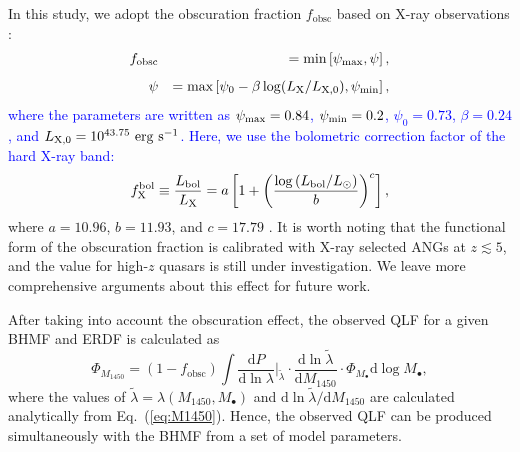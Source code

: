 \documentclass[twocolumn, twocolappendix]{aastex63}
\newcommand{\Mbh}{M_\bullet}
\newcommand{\fobsc}{f_\mathrm{obsc}}
\newcommand{\Muv}{M_{1450}}
\newcommand{\Lbol}{L_\mathrm{bol}}
\newcommand{\D}{\mathrm{d}}
\newcommand{\blue}[1]{\textcolor{blue}{ #1}}
\begin{document}
\begin{CJK*}{UTF8}{gbsn}
In this study, we adopt the obscuration fraction $\fobsc$ based on X-ray observations \citep{2014ApJ...786..104U}:
\blue{
%
\begin{eqnarray}
\fobsc && = \text{min}  \left[ \psi_{\rm max}, \psi \right], \\[5pt]
\psi &&= \text{max}\left[\psi_0  - \beta \log (L_{\rm X}/L_{\rm X,0}), \psi_{\rm min}     \right],
\end{eqnarray}
%
where the parameters are written as $\psi_{\rm max}=0.84$, $\psi_{\rm min}=0.2$, $\psi_{0}=0.73$, $\beta=0.24$, and $L_{\rm X,0}=10^{43.75}~{\rm erg~s}^{-1}$.
%
Here, we use the bolometric correction factor of the hard X-ray band:}
%
\begin{equation}
  f^{\rm bol}_{\rm X} \equiv \frac{\Lbol}{L_{\rm X}}=
  a\left[1+\left(\frac{\log \left(\Lbol / L_\odot\right)}{b}\right)^{c}\right],
\end{equation}
%
where $a=10.96$, $b = 11.93$, and $c = 17.79$ \citep[see Eq.~2 in][]{2020A&A...636A..73D}. 
It is worth noting that the functional form of the obscuration fraction
is calibrated with X-ray selected ANGs at $z\lesssim 5$,
and the value for high-$z$ quasars is still under investigation.
We leave more comprehensive arguments about this effect for future work.


After taking into account the obscuration effect, 
the observed QLF for a given BHMF and ERDF is calculated as
%
\begin{equation}
\label{eq:dn_dM1450}
\Phi_{\Muv} 
 = (1 -\fobsc)  %
\int \frac{\D P}{\D \ln \lambda}\Big|_{\tilde{\lambda}}  \cdot
\frac{\D \ln \tilde{\lambda}}{\D \Muv} \cdot
 \Phi_{\Mbh} \D \log \Mbh,
\end{equation}
%
where the values of $\tilde{\lambda}=\lambda(\Muv, \Mbh)$ and $\D \ln \tilde{\lambda}/\D \Muv$ are calculated analytically from Eq.~(\ref{eq:M1450}).
%
Hence, the observed QLF can be produced simultaneously with the BHMF from a set of model parameters.





\end{CJK*}
\end{document}
